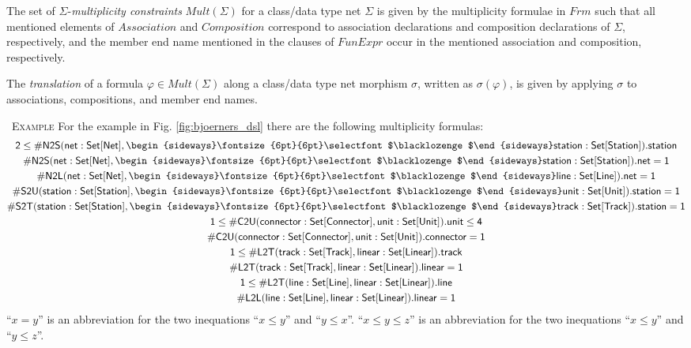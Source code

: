 \documentclass[10pt,fleqn,final]{scrreprt}
\newenvironment{definitions}[0]{\medskip }{}
\newenvironment{example}[0]{\ \newline \textsc{Example}\quad }{}
\newcommand{\composition}{\raisebox{0.2pt}{\begin{sideways}\fontsize{6pt}{6pt}\selectfont$\blacklozenge$\end{sideways}}}
\begin{document}
\begin{definitions}
The set of $\Sigma$-\emph{multiplicity constraints}
$\mathit{Mult}(\Sigma)$ for a class/data type net $\Sigma$ is given by the
multiplicity formulae in $\mathit{Frm}$ such that all mentioned elements
of $\mathit{Association}$ and $\mathit{Composition}$ correspond to
association declarations and composition declarations of $\Sigma$,
respectively, and the member end name mentioned in the clauses of
$\mathit{FunExpr}$ occur in the mentioned association and composition,
respectively.

The \emph{translation} of a formula $\varphi \in \mathit{Mult}(\Sigma)$
along a class/data type net morphism $\sigma$, written as $\sigma(\varphi)$,
is given by applying $\sigma$ to associations, compositions, and member end
names.


\begin{example}
 For the example in Fig. \ref{fig:bjoerners_dsl} there are the following multiplicity formulas:
\begin{gather*}
  \mathsf{2 \leq \#N2S(net : Set[Net], \composition station : Set[Station]).station}
\\
  \mathsf{\#N2S(net : Set[Net], \composition station : Set[Station]).net = 1}
\\
  \mathsf{\#N2L(net : Set[Net], \composition line : Set[Line]).net = 1}
\\
  \mathsf{\#S2U(station : Set[Station], \composition unit : Set[Unit]).station = 1}
\\
  \mathsf{\#S2T(station : Set[Station], \composition track : Set[Track]).station = 1}
\\
  \mathsf{1 \leq \#C2U(connector : Set[Connector], unit : Set[Unit]).unit \leq 4}
\\
  \mathsf{\#C2U(connector : Set[Connector], unit : Set[Unit]).connector = 1}
\\
  \mathsf{1 \leq \#L2T(track : Set[Track], linear : Set[Linear]).track}
\\
  \mathsf{\#L2T(track : Set[Track], linear : Set[Linear]).linear = 1}
\\
  \mathsf{1 \leq \#L2T(line : Set[Line], linear : Set[Linear]).line}
\\
  \mathsf{\#L2L(line : Set[Line], linear : Set[Linear]).linear = 1}
\end{gather*}
%
 ``$x = y$'' is an  
abbreviation for the two inequations ``$x\leq y$'' and ``$y\leq x$''.
``$x \leq y \leq z$'' is an abbreviation for the two  inequations 
``$x\leq y$'' and ``$y\leq z$''.

\end{example}



\end{definitions}
\end{document}
